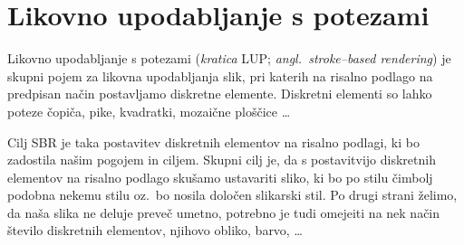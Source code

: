 \chapter{Likovno upodabljanje s potezami}
%
Likovno upodabljanje s potezami (\emph{kratica} LUP; \emph{angl.~stroke--based rendering}) je skupni pojem za likovna upodabljanja slik, pri katerih na risalno podlago na predpisan način postavljamo diskretne elemente. Diskretni elementi so lahko poteze čopiča, pike, kvadratki, mozaične ploščice \ldots

Cilj SBR je taka postavitev diskretnih elementov na risalno podlagi, ki bo zadostila našim pogojem in ciljem. Skupni cilj je, da s postavitvijo diskretnih elementov na risalno podlago skušamo ustavariti sliko, ki bo po stilu čimbolj podobna nekemu stilu oz.\ bo nosila določen slikarski stil. Po drugi strani želimo, da naša slika ne deluje preveč umetno, potrebno je tudi omejeiti na nek način število diskretnih elementov, njihovo obliko, barvo, \ldots


